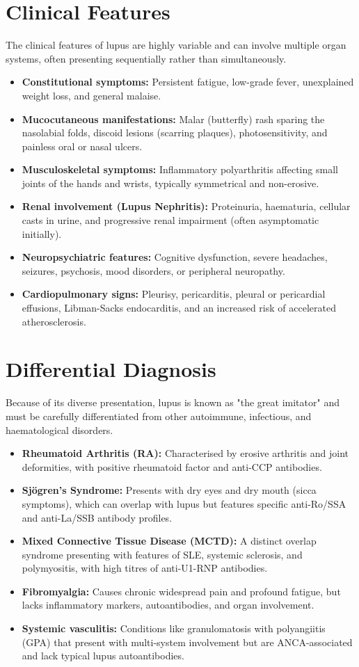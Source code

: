 \section*{Clinical Features}
The clinical features of lupus are highly variable and can involve multiple organ systems, often presenting sequentially rather than simultaneously.
\begin{itemize}
    \item \textbf{Constitutional symptoms:} Persistent fatigue, low-grade fever, unexplained weight loss, and general malaise.
    \item \textbf{Mucocutaneous manifestations:} Malar (butterfly) rash sparing the nasolabial folds, discoid lesions (scarring plaques), photosensitivity, and painless oral or nasal ulcers.
    \item \textbf{Musculoskeletal symptoms:} Inflammatory polyarthritis affecting small joints of the hands and wrists, typically symmetrical and non-erosive.
    \item \textbf{Renal involvement (Lupus Nephritis):} Proteinuria, haematuria, cellular casts in urine, and progressive renal impairment (often asymptomatic initially).
    \item \textbf{Neuropsychiatric features:} Cognitive dysfunction, severe headaches, seizures, psychosis, mood disorders, or peripheral neuropathy.
    \item \textbf{Cardiopulmonary signs:} Pleurisy, pericarditis, pleural or pericardial effusions, Libman-Sacks endocarditis, and an increased risk of accelerated atherosclerosis.
\end{itemize}

\section*{Differential Diagnosis}
Because of its diverse presentation, lupus is known as "the great imitator" and must be carefully differentiated from other autoimmune, infectious, and haematological disorders.
\begin{itemize}
    \item \textbf{Rheumatoid Arthritis (RA):} Characterised by erosive arthritis and joint deformities, with positive rheumatoid factor and anti-CCP antibodies.
    \item \textbf{Sjögren's Syndrome:} Presents with dry eyes and dry mouth (sicca symptoms), which can overlap with lupus but features specific anti-Ro/SSA and anti-La/SSB antibody profiles.
    \item \textbf{Mixed Connective Tissue Disease (MCTD):} A distinct overlap syndrome presenting with features of SLE, systemic sclerosis, and polymyositis, with high titres of anti-U1-RNP antibodies.
    \item \textbf{Fibromyalgia:} Causes chronic widespread pain and profound fatigue, but lacks inflammatory markers, autoantibodies, and organ involvement.
    \item \textbf{Systemic vasculitis:} Conditions like granulomatosis with polyangiitis (GPA) that present with multi-system involvement but are ANCA-associated and lack typical lupus autoantibodies.
\end{itemize}

